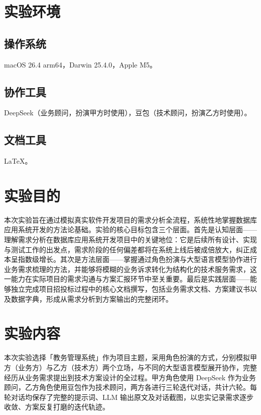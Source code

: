 \documentclass[12pt, a4paper]{academics}
\begin{document}
\makeacademicscover

\section{实验环境}

\subsection{操作系统}

macOS 26.4 arm64，Darwin 25.4.0，Apple M5。

\subsection{协作工具}

DeepSeek（业务顾问，扮演甲方时使用），豆包（技术顾问，扮演乙方时使用）。

\subsection{文档工具}

\LaTeX{}。

\section{实验目的}

本次实验旨在通过模拟真实软件开发项目的需求分析全流程，系统性地掌握数据库应用系统开发的方法论基础。实验的核心目标包含三个层面。首先是认知层面——理解需求分析在数据库应用系统开发项目中的关键地位：它是后续所有设计、实现与测试工作的出发点，需求阶段的任何偏差都将在系统上线后被成倍放大，纠正成本呈指数级增长。其次是方法层面——掌握通过角色扮演与大型语言模型协作进行业务需求梳理的方法，并能够将模糊的业务诉求转化为结构化的技术服务需求，这一能力在实际项目的需求沟通与方案汇报环节中至关重要。最后是实践层面——能够独立完成项目招投标过程中的核心文档撰写，包括业务需求文档、方案建议书以及数据字典，形成从需求分析到方案输出的完整闭环。

\section{实验内容}

本次实验选择「教务管理系统」作为项目主题，采用角色扮演的方式，分别模拟甲方（业务方）与乙方（技术方）两个立场，与不同的大型语言模型展开协作，完整经历从业务需求提出到技术方案设计的全过程。甲方角色使用 DeepSeek 作为业务顾问，乙方角色使用豆包作为技术顾问，两方各进行三轮迭代对话，共计六轮。每轮对话均保存了完整的提示词、LLM 输出原文及对话截图，以忠实记录需求逐步收敛、方案反复打磨的迭代轨迹。
\end{document}
